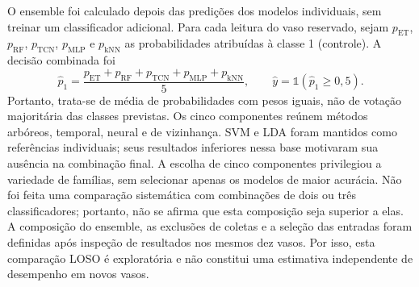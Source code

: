 O ensemble foi calculado depois das predições dos modelos individuais, sem
treinar um classificador adicional. Para cada leitura do vaso reservado,
sejam $p_{\mathrm{ET}}$, $p_{\mathrm{RF}}$, $p_{\mathrm{TCN}}$,
$p_{\mathrm{MLP}}$ e $p_{\mathrm{kNN}}$ as probabilidades atribuídas à classe 1
(controle).
A decisão combinada foi
\begin{equation}
    \widehat{p}_1=\frac{p_{\mathrm{ET}}+p_{\mathrm{RF}}+
    p_{\mathrm{TCN}}+p_{\mathrm{MLP}}+p_{\mathrm{kNN}}}{5},
    \qquad \widehat{y}=\mathbb{1}(\widehat{p}_1\geq 0{,}5).
\end{equation}
Portanto, trata-se de média de probabilidades com pesos iguais, não de
votação majoritária das classes previstas. Os cinco componentes reúnem
métodos arbóreos, temporal, neural e de vizinhança. SVM e LDA foram mantidos
como referências individuais; seus resultados inferiores nessa base
motivaram sua ausência na combinação final. A escolha de cinco componentes
privilegiou a variedade de famílias, sem selecionar apenas os modelos de
maior acurácia. Não foi feita uma comparação sistemática com combinações de
dois ou três classificadores; portanto, não se afirma que esta composição
seja superior a elas. A composição do ensemble, as exclusões de coletas e
a seleção das entradas foram definidas após inspeção de resultados nos
mesmos dez vasos. Por isso, esta comparação LOSO é exploratória e não
constitui uma estimativa independente de desempenho em novos vasos.
